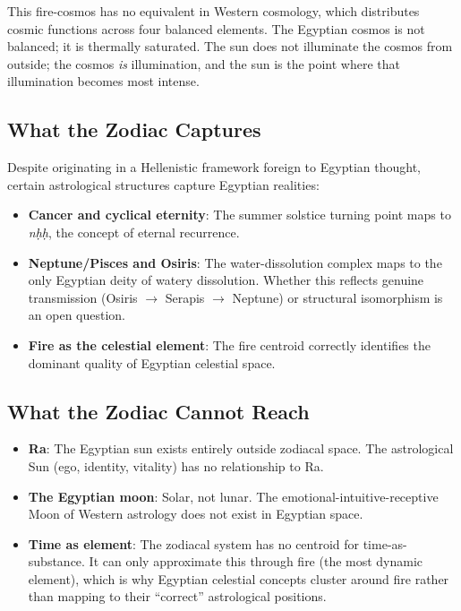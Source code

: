 \documentclass[11pt, a4paper]{article}
\begin{document}
This fire-cosmos has no equivalent in Western cosmology, which distributes cosmic functions across four balanced elements. The Egyptian cosmos is not balanced; it is thermally saturated. The sun does not illuminate the cosmos from outside; the cosmos \textit{is} illumination, and the sun is the point where that illumination becomes most intense.

\subsection{What the Zodiac Captures}

Despite originating in a Hellenistic framework foreign to Egyptian thought, certain astrological structures capture Egyptian realities:

\begin{itemize}[nosep]
    \item \textbf{Cancer and cyclical eternity}: The summer solstice turning point maps to \textit{nḥḥ}, the concept of eternal recurrence.
    \item \textbf{Neptune/Pisces and Osiris}: The water-dissolution complex maps to the only Egyptian deity of watery dissolution. Whether this reflects genuine transmission (Osiris $\rightarrow$ Serapis $\rightarrow$ Neptune) or structural isomorphism is an open question.
    \item \textbf{Fire as the celestial element}: The fire centroid correctly identifies the dominant quality of Egyptian celestial space.
\end{itemize}

\subsection{What the Zodiac Cannot Reach}

\begin{itemize}[nosep]
    \item \textbf{Ra}: The Egyptian sun exists entirely outside zodiacal space. The astrological Sun (ego, identity, vitality) has no relationship to Ra.
    \item \textbf{The Egyptian moon}: Solar, not lunar. The emotional-intuitive-receptive Moon of Western astrology does not exist in Egyptian space.
    \item \textbf{Time as element}: The zodiacal system has no centroid for time-as-substance. It can only approximate this through fire (the most dynamic element), which is why Egyptian celestial concepts cluster around fire rather than mapping to their ``correct'' astrological positions.
\end{itemize}
\end{document}
